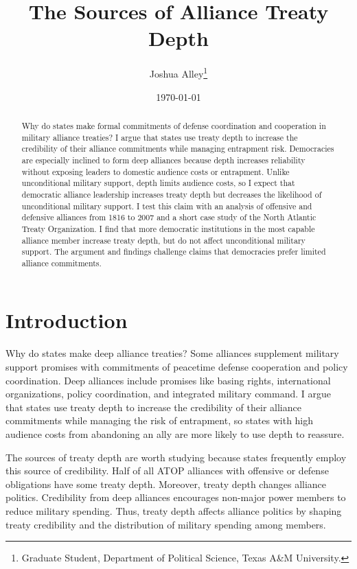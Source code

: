 \documentclass[12pt]{article}
\title{\textbf{The Sources of Alliance Treaty Depth}}
\author{Joshua Alley\footnote{Graduate Student,
Department of Political Science, Texas A\&M University.}}
\date{\today}
\begin{document}
\maketitle 

\doublespace 

\begin{abstract}
Why do states make formal commitments of defense coordination and cooperation in military alliance treaties? 
I argue that states use treaty depth to increase the credibility of their alliance commitments while managing entrapment risk. 
Democracies are especially inclined to form deep alliances because depth increases reliability without exposing leaders to domestic audience costs or entrapment.
Unlike unconditional military support, depth limits audience costs, so I expect that democratic alliance leadership increases treaty depth but decreases the likelihood of unconditional military support. 
I test this claim with an analysis of offensive and defensive alliances from 1816 to 2007 and a short case study of the North Atlantic Treaty Organization.
I find that more democratic institutions in the most capable alliance member increase treaty depth, but do not affect unconditional military support.   
The argument and findings challenge claims that democracies prefer limited alliance commitments. 
\end{abstract}


\newpage 


\section{Introduction}


Why do states make deep alliance treaties? 
Some alliances supplement military support promises with commitments of peacetime defense cooperation and policy coordination. 
Deep alliances include promises like basing rights, international organizations, policy coordination, and integrated military command.
I argue that states use treaty depth to increase the credibility of their alliance commitments while managing the risk of entrapment, so states with high audience costs from abandoning an ally are more likely to use depth to reassure. 

 
The sources of treaty depth are worth studying because states frequently employ this source of credibility.
Half of all ATOP alliances with offensive or defense obligations have some treaty depth.
Moreover, treaty depth changes alliance politics. 
Credibility from deep alliances encourages non-major power members to reduce military spending.  
Thus, treaty depth affects alliance politics by shaping treaty credibility and the distribution of military spending among members. 
\end{document}

